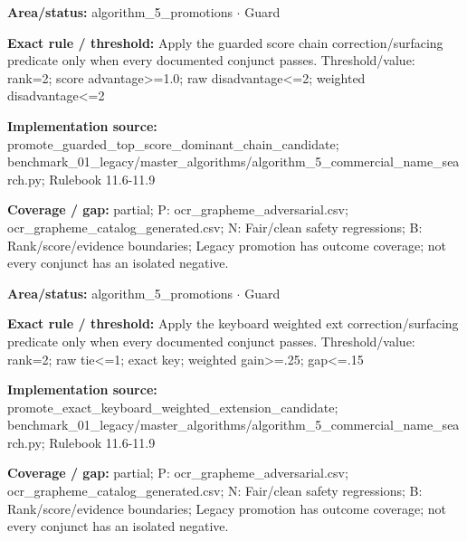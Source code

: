 \begin{tcolorbox}[enhanced,breakable,colback=white,colframe=Muted!45,boxrule=0.45pt,arc=1.5pt,left=6pt,right=6pt,top=5pt,bottom=5pt,title={\texttt{A5-PROMOTE-GUARDED-SCORE-CHAIN}},title after break={\texttt{A5-PROMOTE-GUARDED-SCORE-CHAIN}\ (continued)},fonttitle=\headingfont\bfseries\color{Navy},coltitle=Navy]
\textbf{Area/status:} algorithm\_\allowbreak{}5\_\allowbreak{}promotions $\boldsymbol{\cdot}$ Guard\par
\smallskip
\textbf{Exact rule / threshold:} Apply the guarded score chain correction/\allowbreak{}surfacing predicate only when every documented conjunct passes. Threshold/\allowbreak{}value: rank=2; score advantage>=1.0; raw disadvantage<=2; weighted disadvantage<=2\par
\smallskip
\textbf{Implementation source:} promote\_\allowbreak{}guarded\_\allowbreak{}top\_\allowbreak{}score\_\allowbreak{}dominant\_\allowbreak{}chain\_\allowbreak{}candidate; benchmark\_\allowbreak{}01\_\allowbreak{}legacy/\allowbreak{}master\_\allowbreak{}algorithms/\allowbreak{}algorithm\_\allowbreak{}5\_\allowbreak{}commercial\_\allowbreak{}name\_\allowbreak{}search.py; Rulebook 11.6-11.9\par
\smallskip
\textbf{Coverage / gap:} partial; P: ocr\_\allowbreak{}grapheme\_\allowbreak{}adversarial.csv; ocr\_\allowbreak{}grapheme\_\allowbreak{}catalog\_\allowbreak{}generated.csv; N: Fair/\allowbreak{}clean safety regressions; B: Rank/\allowbreak{}score/\allowbreak{}evidence boundaries; Legacy promotion has outcome coverage; not every conjunct has an isolated negative.
\end{tcolorbox}
\begin{tcolorbox}[enhanced,breakable,colback=white,colframe=Muted!45,boxrule=0.45pt,arc=1.5pt,left=6pt,right=6pt,top=5pt,bottom=5pt,title={\texttt{A5-PROMOTE-KEYBOARD-WEIGHTED-EXT}},title after break={\texttt{A5-PROMOTE-KEYBOARD-WEIGHTED-EXT}\ (continued)},fonttitle=\headingfont\bfseries\color{Navy},coltitle=Navy]
\textbf{Area/status:} algorithm\_\allowbreak{}5\_\allowbreak{}promotions $\boldsymbol{\cdot}$ Guard\par
\smallskip
\textbf{Exact rule / threshold:} Apply the keyboard weighted ext correction/\allowbreak{}surfacing predicate only when every documented conjunct passes. Threshold/\allowbreak{}value: rank=2; raw tie<=1; exact key; weighted gain>=.25; gap<=.15\par
\smallskip
\textbf{Implementation source:} promote\_\allowbreak{}exact\_\allowbreak{}keyboard\_\allowbreak{}weighted\_\allowbreak{}extension\_\allowbreak{}candidate; benchmark\_\allowbreak{}01\_\allowbreak{}legacy/\allowbreak{}master\_\allowbreak{}algorithms/\allowbreak{}algorithm\_\allowbreak{}5\_\allowbreak{}commercial\_\allowbreak{}name\_\allowbreak{}search.py; Rulebook 11.6-11.9\par
\smallskip
\textbf{Coverage / gap:} partial; P: ocr\_\allowbreak{}grapheme\_\allowbreak{}adversarial.csv; ocr\_\allowbreak{}grapheme\_\allowbreak{}catalog\_\allowbreak{}generated.csv; N: Fair/\allowbreak{}clean safety regressions; B: Rank/\allowbreak{}score/\allowbreak{}evidence boundaries; Legacy promotion has outcome coverage; not every conjunct has an isolated negative.
\end{tcolorbox}
